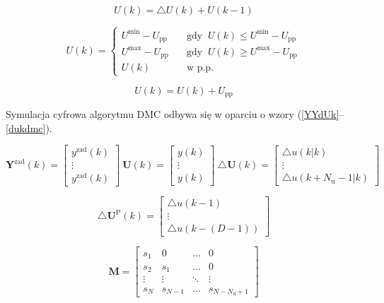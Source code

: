 \begin{equation}
U(k) = \triangle U(k) + U(k-1)
\label{uk}
\end{equation}

\begin{equation}
U(k) = 
\begin{cases}
U^{\mathrm{min}} - U_{\mathrm{pp}} &\quad \textrm{gdy } \ U(k) \le U^{\mathrm{min}}-U_{\mathrm{pp}} \\
U^{\mathrm{max}}-U_{\mathrm{pp}} &\quad \textrm{gdy } \ U(k) \ge U^{\mathrm{max}}-U_{\mathrm{pp}}  \\
U(k) &\quad \textrm{w p.p.}
\end{cases}
\label{uk2}
\end{equation}

\begin{equation}
U(k) = U(k) + U_{\mathrm{pp}}
\label{upp}
\end{equation}

Symulacja cyfrowa algorytmu DMC odbywa się w oparciu o wzory (\ref{YYdUk}--\ref{dukdmc}).

\begin{equation}
\boldsymbol{Y}^{\mathrm{zad}}(k)=\left[
\begin{array}{c}
y^{\mathrm{zad}}(k)\\
\vdots\\
y^{\mathrm{zad}}(k)
\end{array}
\right] \
\boldsymbol{U}(k)=\left[
\begin{array}{c}
y(k)\\
\vdots\\
y(k)
\end{array}
\right] \
\triangle \boldsymbol{U}(k)=\left[
\begin{array}{c}
\triangle u(k|k)\\
\vdots\\
\triangle u(k+N_{\mathrm{u}}-1|k)
\end{array}
\right] \
\label{YYdUk}
\end{equation}

\begin{equation}
\triangle \boldsymbol{U}^{\mathrm{P}}(k)=\left[
\begin{array}{c}
\triangle u(k-1)\\
\vdots\\
\triangle u(k-(D-1))
\end{array}
\right]
\label{dUp}
\end{equation}

\begin{equation}
\boldsymbol{M}=\left[
\begin{array}
{cccc}
s_{1} & 0 & \ldots & 0\\
s_{2} & s_{1} & \ldots & 0\\
\vdots & \vdots & \ddots & \vdots\\
s_{N} & s_{N-1} & \ldots &  s_{N-N_{\mathrm{u}}+1}
\end{array}
\right]
\label{Marray}
\end{equation}

